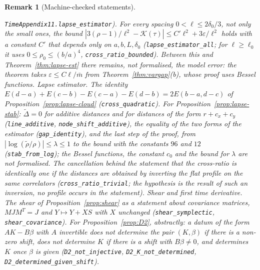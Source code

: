 \documentclass[11pt,a4paper]{article}
\theoremstyle{stmt}
\theoremstyle{defn}
\theoremstyle{rmk}
\newtheorem{remark}[theorem]{Remark}
\numberwithin{equation}{section}
\begin{document}
{\begin{remark}[Machine-checked statements]
\begin{itemize}
\texttt{TimeAppendix11.lapse\_estimator}). For every spacing $0<\ell\le2\delta_0/3$, not only the small ones, the bound $|3(\rho-1)/\ell^2-\mathcal K(\tau)|\le C'\ell^2+3\varepsilon/\ell^2$ holds with a constant $C'$ that depends only on $a,b,L,\delta_0$ (\texttt{lapse\_estimator\_all}; for $\ell\ge\ell_0$ it uses $0\le\rho_0\le(b/a)^4$, \texttt{cross\_ratio\_bounded}). Between this and Theorem~\ref{thm:lapse-est} there remains, not formalised, the model error: the theorem takes $\varepsilon\le C\ell/\bar m$ from Theorem~\ref{thm:vargap}(b), whose proof uses Bessel functions.
\emph{Lapse estimator.} The identity $E(d-a)+E(c-b)-E(c-a)-E(d-b)=2E(b-a,d-c)$ of Proposition~\ref{prop:lapse-cloud} (\texttt{cross\_quadratic}). For Proposition~\ref{prop:lapse-stab}: $\tilde\Delta=0$ for additive distances and for distances of the form $r+c_x+c_y$ (\texttt{line\_additive}, \texttt{node\_shift\_additive}), the equality of the two forms of the estimator (\texttt{gap\_identity}), and the last step of the proof, from $|\log(\tilde\rho/\rho)|\le\lambda\le1$ to the bound with the constants $96$ and $12$ (\texttt{stab\_from\_log}); the Bessel functions, the constant $c_0$ and the bound for $\lambda$ are not formalised. The cancellation behind the statement that the cross-ratio is identically one if the distances are obtained by inverting the flat profile on the same correlators (\texttt{cross\_ratio\_trivial}; the hypothesis is the result of such an inversion, no profile occurs in the statement).
\emph{Shear and first time derivative.} The shear of Proposition~\ref{prop:shear} as a statement about covariance matrices, $MJM^{T}=J$ and $Y\mapsto Y+XS$ with $X$ unchanged (\texttt{shear\_symplectic}, \texttt{shear\_covariance}). For Proposition~\ref{prop:D2}, abstractly: a datum of the form $AK-B\beta$ with $A$ invertible does not determine the pair $(K,\beta)$ if there is a non-zero shift, does not determine $K$ if there is a shift with $B\beta\ne0$, and determines $K$ once $\beta$ is given (\texttt{D2\_not\_injective}, \texttt{D2\_K\_not\_determined}, \texttt{D2\_determined\_given\_shift}).

\end{itemize}
\end{remark}}
\end{document}
